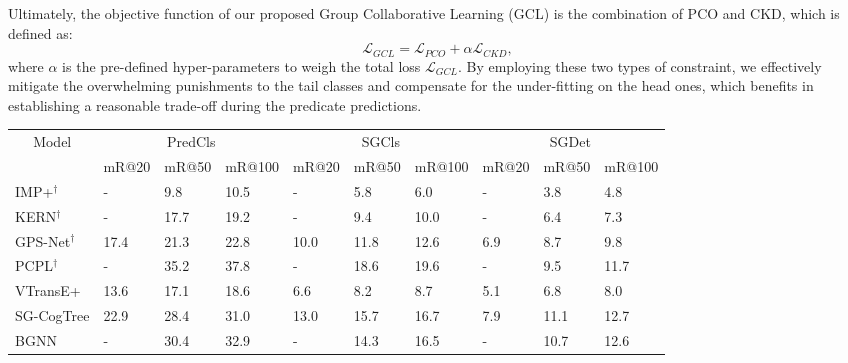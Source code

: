 \documentclass[10pt,twocolumn,letterpaper]{article}
\begin{document}
Ultimately, the objective function of our proposed Group Collaborative Learning (GCL) is the combination of PCO and CKD, which is defined as:
\begin{equation}
	\mathcal{L}_{GCL} = \mathcal{L}_{PCO} + \alpha\mathcal{L}_{CKD},
\end{equation}
where $\alpha$ is the pre-defined hyper-parameters to weigh the total loss $\mathcal{L}_{GCL}$. By employing these two types of constraint, we effectively mitigate the overwhelming punishments to the tail classes and compensate for the under-fitting on the head ones, which benefits in establishing a reasonable trade-off during the predicate predictions.




\begin{table*}[t]
	\small
	\vspace{-0.4cm}
	\begin{tabular}{p{2.9cm}|p{1.1cm}<{\centering}p{1.1cm}<{\centering}p{1.1cm}<{\centering}|p{1.1cm}<{\centering}p{1.1cm}<{\centering}p{1.1cm}<{\centering}|p{1.1cm}<{\centering}p{1.1cm}<{\centering}p{1.1cm}<{\centering}}
		\hline
		\multicolumn{1}{c|}{\multirow{2}{*}{Model}} & \multicolumn{3}{c|}{PredCls}& \multicolumn{3}{c|}{SGCls}& \multicolumn{3}{c}{SGDet}\\ \cline{2-10} 
		\multicolumn{1}{c|}{}& \multicolumn{1}{c}{mR@20} & \multicolumn{1}{c}{mR@50} & \multicolumn{1}{c|}{mR@100} & \multicolumn{1}{c}{mR@20} & \multicolumn{1}{c}{mR@50} & \multicolumn{1}{c|}{mR@100} & \multicolumn{1}{c}{mR@20} & \multicolumn{1}{c}{mR@50} & \multicolumn{1}{c}{mR@100} \\ \hline
		
		IMP+$^\dag$ & -  &9.8  &10.5 &-  &5.8  &6.0 &-  & 3.8 &4.8 \\
		KERN$^\dag$ & -  &17.7  &19.2 &-  &9.4  &10.0 &-  & 6.4 &7.3 \\
		GPS-Net$^\dag$ & 17.4  &21.3  &22.8 &10.0  &11.8  &12.6 &6.9  & 8.7 &9.8 \\
		PCPL$^\dag$ & -  &35.2  &37.8 &-  &18.6  &19.6 &-  & 9.5 &11.7 \\
		VTransE+ &13.6  &17.1  &18.6 &6.6  &8.2  &8.7 &5.1  & 6.8 &8.0 \\
	    SG-CogTree & 22.9  &28.4  &31.0 &13.0  &15.7  &16.7 &7.9  & 11.1 &12.7 \\
		BGNN & -  &30.4  &32.9 &-  &14.3  &16.5 &-  & 10.7 &12.6 \\
		
		 \hline
		

\end{tabular}
\end{table*}
\end{document}
